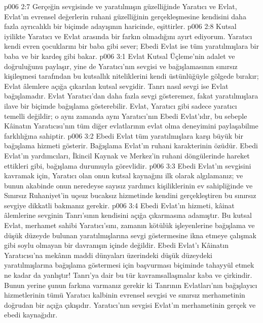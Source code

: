 \vs p006 2:7 Gerçeğin sevgisinde ve yaratılmışın güzelliğinde Yaratıcı ve Evlat, Evlat’ın evrensel değerlerin ruhani güzelliğinin gerçekleşmesine kendisini daha fazla ayrıcalıklı bir biçimde adayışının  haricinde, eşittirler.
\vs p006 2:8 Kutsal iyilikte Yaratıcı ve Evlat arasında bir farkın olmadığını ayırt ediyorum. Yaratıcı kendi evren çocuklarını bir baba gibi sever; Ebedi Evlat ise tüm yaratılmışlara bir baba ve bir kardeş gibi bakar.
\vs p006 3:1 Evlat Kutsal Üçleme’nin adalet ve doğruluğunu paylaşır, yine de Yaratıcı’nın sevgisi ve bağışlamasının sınırsız kişileşmesi tarafından bu kutsallık niteliklerini kendi üstünlüğüyle gölgede bırakır; Evlat âlemlere açığa çıkarılan kutsal sevgidir. Tanrı nasıl sevgi ise Evlat bağışlamadır. Evlat Yaratıcı’dan daha fazla sevgi gösteremez, fakat yaratılmışlara ilave bir biçimde bağışlama gösterebilir. Evlat, Yaratıcı gibi sadece yaratıcı temelli değildir; o aynı zamanda aynı Yaratıcı’nın Ebedi Evlat’ıdır, bu sebeple Kâinatın Yaratıcısı’nın tüm diğer evlatlarının evlat olma deneyimini paylaşabilme farklılığına sahiptir.
\vs p006 3:2 Ebedi Evlat tüm yaratılmışlara karşı büyük bir bağışlama hizmeti gösterir. Bağışlama Evlat’ın ruhani karakterinin özüdür. Ebedi Evlat’ın yardımcıları, İkincil Kaynak ve Merkez’in ruhani döngülerinde hareket ettikleri gibi, bağışlama durumuyla görevlidir.
\vs p006 3:3 Ebedi Evlat’ın sevgisini kavramak için,  Yaratıcı olan onun kutsal kaynağını ilk olarak algılamanız; ve bunun akabinde onun neredeyse sayısız yardımcı kişiliklerinin ev sahipliğinde ve Sınırsız Ruhaniyet’in uçsuz bucaksız hizmetinde kendini gerçekleştiren bu sınırsız sevgiye dikkatli bakmanız gerekir.
\vs p006 3:4 Ebedi Evlat’ın hizmeti, kâinat âlemlerine sevginin Tanrı’sının kendisini açığa çıkarmasına adamıştır. Bu kutsal Evlat, merhamet sahibi Yaratıcı’sını, zamanın kötülük işleyenlerine bağışlama ve düşük düzeyde bulunan yaratılmışlarına sevgi göstermesine ikna etmeye çalışmak gibi soylu olmayan bir davranışın içinde değildir. Ebedi Evlat’ı Kâinatın Yaratıcısı’na mekânın maddi dünyaları üzerindeki düşük düzeydeki yaratılmışlarına bağışlama göstermesi için başvurması biçiminde tahayyül etmek ne kadar da yanlıştır! Tanrı’ya dair bu tür kavramsallaşmalar kaba ve çirkindir. Bunun yerine şunun farkına varmanız gerekir ki Tanrının Evlatları’nın bağışlayıcı hizmetlerinin tümü Yaratıcı kalbinin evrensel sevgisi ve sınırsız merhametinin doğrudan bir açığa çıkışıdır. Yaratıcı’nın sevgisi Evlat’ın merhametinin gerçek ve ebedi kaynağıdır.
